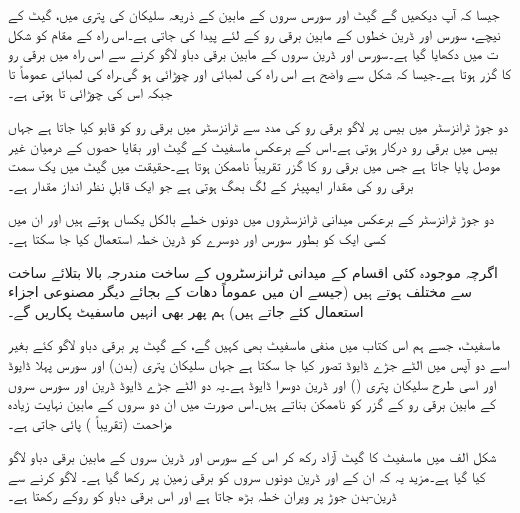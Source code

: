 جیسا کہ آپ دیکھیں گے گیٹ اور سورس سروں کے مابین   کے ذریعہ سلیکان کی پتری میں، گیٹ کے نیچے، سورس اور ڈرین خطوں کے مابین برقی رو کے لئے   پیدا کی جاتی ہے۔اس راہ کے مقام کو شکل  ت میں دکھایا گیا ہے۔سورس اور ڈرین سروں کے مابین برقی دباو لاگو کرنے سے اس راہ میں برقی رو کا گزر ہوتا ہے۔جیسا کہ شکل سے واضح ہے اس راہ کی لمبائی  اور چوڑائی  ہو گی۔راہ کی لمبائی عموماً    تا  جبکہ اس کی چوڑائی  تا  ہوتی ہے۔

دو جوڑ ٹرانزسٹر میں بیس پر لاگو برقی رو کی مدد سے ٹرانزسٹر میں برقی رو  کو قابو کیا جاتا ہے جہاں بیس میں  برقی رو درکار ہوتی ہے۔اس کے برعکس ماسفیٹ کے گیٹ  اور بقایا حصوں کے درمیان غیر موصل  پایا جاتا ہے جس میں برقی رو کا گزر تقریباً ناممکن ہوتا ہے۔حقیقت میں گیٹ میں یک سمت برقی رو کی مقدار  ایمپیئر کے لگ بھگ  ہوتی ہے جو ایک قابلِ نظر انداز مقدار ہے۔

دو جوڑ ٹرانزسٹر کے برعکس میدانی ٹرانزسٹروں میں دونوں  خطے بالکل یکساں ہوتے ہیں اور ان میں کسی ایک کو بطور سورس اور دوسرے کو ڈرین خطہ استعمال کیا جا سکتا ہے۔ 

اگرچہ موجودہ کئی اقسام کے میدانی ٹرانزسٹروں کے ساخت مندرجہ بالا بتلائے ساخت سے مختلف ہوتے ہیں (جیسے ان میں عموماً دھات کے بجائے دیگر مصنوعی  اجزاء استعمال کئے جاتے ہیں) ہم پھر بھی انہیں ماسفیٹ پکاریں گے۔


 ماسفیٹ، جسے ہم اس کتاب میں منفی ماسفیٹ بھی کہیں گے، کے گیٹ پر برقی دباو لاگو کئے بغیر اسے دو آپس میں الٹے جڑے ڈایوڈ تصور کیا جا سکتا ہے جہاں  سلیکان پتری (بدن) اور   سورس پہلا ڈایوڈ اور اسی طرح   سلیکان پتری () اور   ڈرین دوسرا ڈایوڈ ہے۔یہ دو الٹے جڑے ڈایوڈ ڈرین اور سورس سروں کے مابین برقی رو کے گزر کو ناممکن بناتے ہیں۔اس صورت میں ان دو سروں کے مابین نہایت زیادہ مزاحمت (تقریباً   ) پائی جاتی ہے۔

شکل  الف میں ماسفیٹ کا گیٹ آزاد رکھ کر اس کے سورس اور ڈرین سروں کے مابین برقی دباو  لاگو کیا گیا ہے۔مزید یہ کہ ان کے  اور ڈرین دونوں سروں کو برقی زمین پر رکھا گیا ہے۔   لاگو کرنے سے ڈرین-بدن جوڑ پر ویران خطہ بڑھ جاتا ہے اور اس برقی دباو کو روکے رکھتا ہے۔

